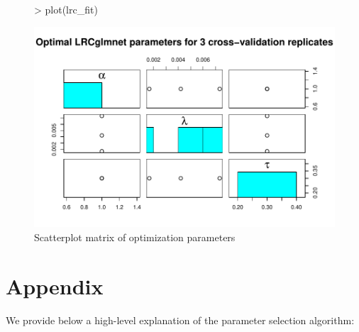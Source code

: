 \documentclass{article}
\begin{document}
\begin{figure}[H]
\begin{center}
\begin{Schunk}
\begin{Sinput}
> plot(lrc_fit)
\end{Sinput}
\end{Schunk}
\includegraphics{lrc-plot}
\caption{Scatterplot matrix of optimization parameters}
\end{center}
\end{figure}

\nocite{*}

  

\newpage

\section*{Appendix}
We provide below a high-level explanation of the parameter selection algorithm:
\end{document}
